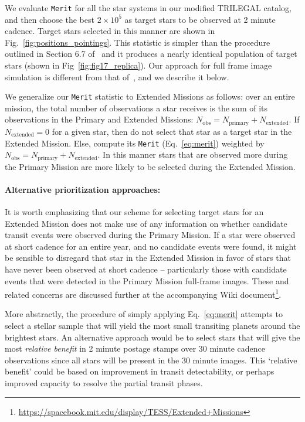 We evaluate \texttt{Merit} for all the star systems in our modified
TRILEGAL catalog, and then choose the best $2\times10^5$ as target
stars to be observed at 2 minute cadence.  Target stars selected in
this manner are shown in Fig.~\ref{fig:positions_pointings}. 
This statistic is simpler than the procedure outlined in Section 6.7
of~ and it produces a nearly identical
population of target stars (shown in Fig~\ref{fig:fig17_replica}).
Our approach for full frame image simulation is different from that
of~, and we describe it below.

We generalize our \texttt{Merit} statistic to Extended Missions as 
follows: over an
entire mission, the total number of observations a star receives is
the sum of its observations in the Primary and Extended Missions:
$N_\text{obs}=N_\text{primary}+N_\text{extended}$.  If
$N_\text{extended}=0$ for a given star, then do not select that star as a
target star in the Extended Mission.  Else, compute its \texttt{Merit}
(Eq.~\ref{eq:merit}) weighted by
$N_\text{obs}=N_\text{primary}+N_\text{extended}$.  In this manner
stars that are observed more during the Primary Mission are more
likely to be selected during the Extended Mission.
 

\paragraph{Alternative prioritization approaches:}

It is worth emphasizing that our scheme for selecting target stars for
an Extended Mission does not make use of any information on whether
candidate transit events were observed during the Primary Mission.  If
a star were observed at short cadence for an entire year, and no
candidate events were found, it might be sensible to disregard that
star in the Extended Mission in favor of stars that have never been
observed at short cadence -- particularly those with candidate events
that were detected in the Primary Mission full-frame images.  These
and related concerns are discussed further at the accompanying Wiki
document\footnote{\url{https://spacebook.mit.edu/display/TESS/Extended+Missions}}.

More abstractly, the procedure of simply applying Eq.~\ref{eq:merit}
attempts to select a stellar sample that will yield the most small
transiting planets around the brightest stars.  An alternative
approach would be to select stars that will give the most 
\textit{relative benefit} in 2 minute postage stamps over 30 
minute cadence observations since all stars will be present in the
30 minute images.  This `relative benefit' could be based on
improvement in transit detectability, or perhaps improved 
capacity to resolve the partial transit phases.

